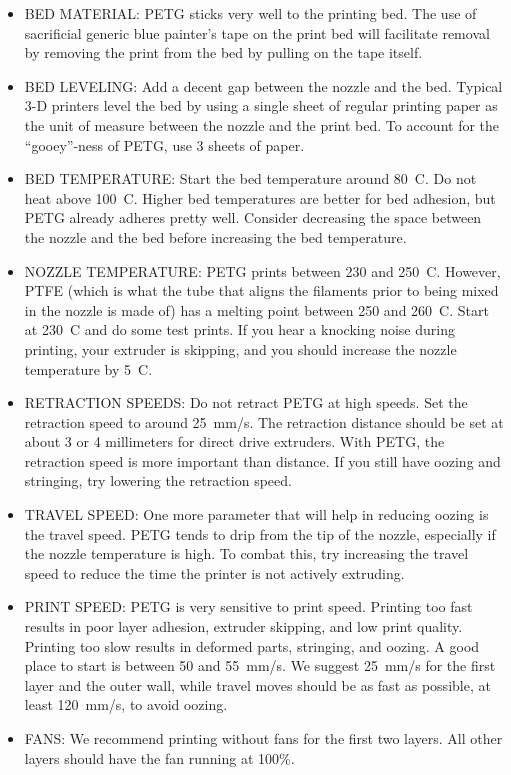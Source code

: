 \begin{itemize}
    \item BED MATERIAL: PETG sticks very well to the printing bed. The use of sacrificial generic blue painter's tape on the print bed will facilitate removal by removing the print from the bed by pulling on the tape itself.
    \item BED LEVELING: Add a decent gap between the nozzle and the bed. Typical 3-D printers level the bed by using a single sheet of regular printing paper as the unit of measure between the nozzle and the print bed. To account for the ``gooey''-ness of PETG, use 3 sheets of paper.
    \item BED TEMPERATURE: Start the bed temperature around 80\textdegree~C. Do not heat above 100\textdegree~C. Higher bed temperatures are better for bed adhesion, but PETG already adheres pretty well. Consider decreasing the space between the nozzle and the bed before increasing the bed temperature. 
    \item NOZZLE TEMPERATURE: PETG prints between 230 and 250\textdegree~C. However, PTFE (which is what the tube that aligns the filaments prior to being mixed in the nozzle is made of) has a melting point between 250 and 260\textdegree~C. Start at 230\textdegree~C and do some test prints. If you hear a knocking noise during printing, your extruder is skipping, and you should increase the nozzle temperature by 5\textdegree~C. 
    \item RETRACTION SPEEDS: Do not retract PETG at high speeds. Set the retraction speed to around 25~mm/s. The retraction distance should be set at about 3 or 4 millimeters for direct drive extruders. With PETG, the retraction speed is more important than distance. If you still have oozing and stringing, try lowering the retraction speed.
    \item TRAVEL SPEED: One more parameter that will help in reducing oozing is the travel speed. PETG tends to drip from the tip of the nozzle, especially if the nozzle temperature is high. To combat this, try increasing the travel speed to reduce the time the printer is not actively extruding.
    \item PRINT SPEED: PETG is very sensitive to print speed. Printing too fast results in poor layer adhesion, extruder skipping, and low print quality. Printing too slow results in deformed parts, stringing, and oozing. A good place to start is between 50 and 55~mm/s. We suggest 25~mm/s for the first layer and the outer wall, while travel moves should be as fast as possible, at least 120~mm/s, to avoid oozing.
    \item FANS: We recommend printing without fans for the first two layers. All other layers should have the fan running at 100\%. 
\end{itemize}


